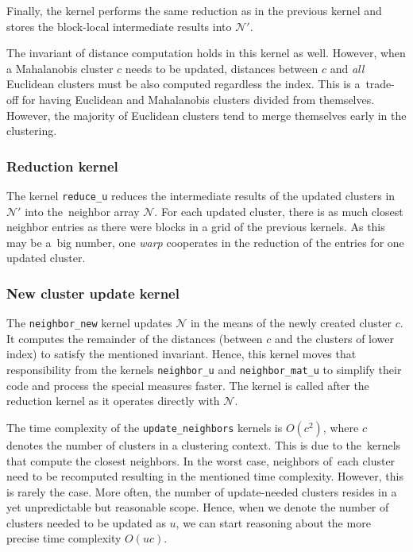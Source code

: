 Finally, the kernel performs the same reduction as in the previous kernel and stores the block-local intermediate results into $\mathcal{N}'$.

\begin{rem}
	The invariant of distance computation holds in this kernel as well. However, when a Mahalanobis cluster $c$ needs to be updated, distances between $c$ and \emph{all} Euclidean clusters must be also computed regardless the index. This is a~trade-off for having Euclidean and Mahalanobis clusters divided from themselves. However, the majority of Euclidean clusters tend to merge themselves early in the clustering.
\end{rem}

\subsubsection{Reduction kernel} The kernel \texttt{reduce\_u} reduces the intermediate results of the updated clusters in~$\mathcal{N}'$ into the~neighbor array $\mathcal{N}$. For each updated cluster, there is as much closest neighbor entries as there were blocks in a grid of the previous kernels. As this may be a~big number, one \emph{warp} cooperates in the reduction of the entries for one updated cluster.

\subsubsection{New cluster update kernel} The \texttt{neighbor\_new} kernel updates $\mathcal{N}$ in the means of the newly created cluster $c$. It computes the remainder of the distances (between $c$ and the clusters of lower index) to satisfy the mentioned invariant. Hence, this kernel moves that responsibility from the kernels \texttt{neighbor\_u} and \texttt{neighbor\_mat\_u} to simplify their code and process the special measures faster. The kernel is called after the reduction kernel as it operates directly with $\mathcal{N}$. 

\begin{rem}
	The time complexity of the \texttt{update\_neighbors} kernels is $O(c^2)$, where $c$ denotes the number of clusters in a clustering context. This is due to the~kernels that compute the closest neighbors. In the worst case, neighbors of~each cluster need to be recomputed resulting in the mentioned time complexity. However, this is rarely the case. More often, the number of update-needed clusters resides in a yet unpredictable but reasonable scope. Hence, when we denote the number of clusters needed to be updated as $u$, we can start reasoning about the more precise time complexity $O(uc)$.
\end{rem}
